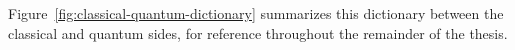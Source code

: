 Figure~\ref{fig:classical-quantum-dictionary}
summarizes this dictionary between the classical and quantum sides,
for reference throughout the remainder of the thesis.


